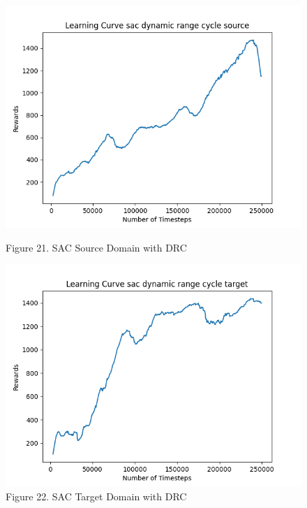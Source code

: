 \documentclass[12pt]{article}
\begin{document}
\begin{figure}[H]
    \centering
    \begin{minipage}{0.45\textwidth}
        \centering
        \includegraphics[width=\textwidth]{../images/Learning_Curve_SAC_DRC_Source.png}
        \caption{Figure 21. SAC Source Domain with DRC}
        \label{fig:sac_source_drc}
    \end{minipage}
    \hfill
    \begin{minipage}{0.45\textwidth}
        \centering
        \includegraphics[width=\textwidth]{../images/Learning_Curve_SAC_DRC_Target.png}
        \caption{Figure 22. SAC Target Domain with DRC}
        \label{fig:sac_target_drc}
    \end{minipage}

\end{figure}
\end{document}
